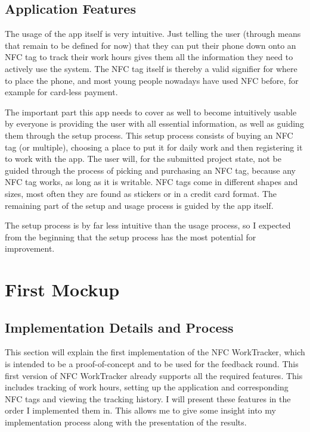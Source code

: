 \documentclass[conference]{IEEEtran}
\newcommand{\projectname}{NFC WorkTracker}
\begin{document}
\subsection{Application Features}
The usage of the app itself is very intuitive. Just telling the user (through means that remain to be defined for now) that they can put their phone down onto an NFC tag to track their work hours gives them all the information they need to actively use the system. The NFC tag itself is thereby a valid signifier for where to place the phone, and most young people nowadays have used NFC before, for example for card-less payment.

The important part this app needs to cover as well to become intuitively usable by everyone is providing the user with all essential information, as well as guiding them through the setup process. This setup process consists of buying an NFC tag (or multiple), choosing a place to put it for daily work and then registering it to work with the app.
The user will, for the submitted project state, not be guided through the process of picking and purchasing an NFC tag, because any NFC tag works, as long as it is writable. NFC tags come in different shapes and sizes, most often they are found as stickers or in a credit card format. The remaining part of the setup and usage process is guided by the app itself.

The setup process is by far less intuitive than the usage process, so I expected from the beginning that the setup process has the most potential for improvement.

\section{First Mockup}
\subsection{Implementation Details and Process}
This section will explain the first implementation of the \projectname{}, which is intended to be a proof-of-concept and to be used for the feedback round. This first version of \projectname{} already supports all the required features. This includes tracking of work hours, setting up the application and corresponding NFC tags and viewing the tracking history. I will present these features in the order I implemented them in. This allows me to give some insight into my implementation process along with the presentation of the results.
\end{document}
